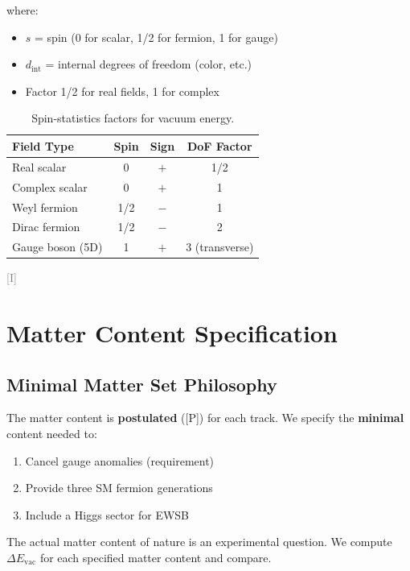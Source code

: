 \documentclass[11pt,a4paper]{article}
\newcommand{\tagP}{\textcolor{green!50!black}{[P]}}
\newcommand{\tagI}{\textcolor{gray}{[I]}}
\begin{document}
where:
\begin{itemize}
    \item $s$ = spin (0 for scalar, 1/2 for fermion, 1 for gauge)
    \item $d_{\text{int}}$ = internal degrees of freedom (color, etc.)
    \item Factor 1/2 for real fields, 1 for complex
\end{itemize}

\begin{table}[h]
\centering
\begin{tabular}{lccc}
\toprule
Field Type & Spin & Sign & DoF Factor \\
\midrule
Real scalar & 0 & $+$ & 1/2 \\
Complex scalar & 0 & $+$ & 1 \\
Weyl fermion & 1/2 & $-$ & 1 \\
Dirac fermion & 1/2 & $-$ & 2 \\
Gauge boson (5D) & 1 & $+$ & 3 (transverse) \\
\bottomrule
\end{tabular}
\caption{Spin-statistics factors for vacuum energy.}
\label{tab:dof}
\end{table}

\tagI

\section{Matter Content Specification}

\subsection{Minimal Matter Set Philosophy}

\begin{warningbox}
The matter content is \textbf{postulated} (\tagP) for each track. We specify the
\textbf{minimal} content needed to:
\begin{enumerate}
    \item Cancel gauge anomalies (requirement)
    \item Provide three SM fermion generations
    \item Include a Higgs sector for EWSB
\end{enumerate}

The actual matter content of nature is an experimental question. We compute
$\Delta E_{\text{vac}}$ for each specified matter content and compare.
\end{warningbox}
\end{document}

